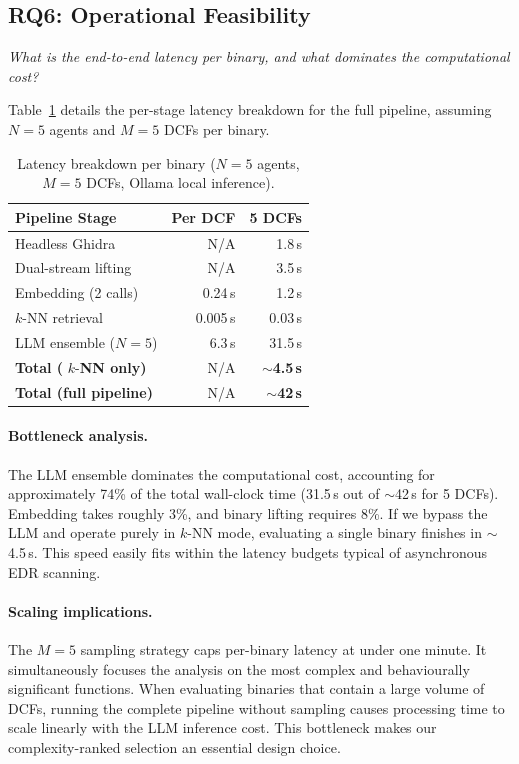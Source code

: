 \documentclass[pdflatex,sn-mathphys-num]{sn-jnl}
\begin{document}
\subsection{RQ6: Operational Feasibility}
\label{sec:rq6}
\textit{What is the end-to-end latency per binary, and what dominates
the computational cost?}

Table~\ref{tab:latency} details the per-stage latency breakdown for the
full pipeline, assuming $N{=}5$ agents and $M{=}5$ DCFs per binary.

\begin{table}[t]
\centering
\caption{Latency breakdown per binary ($N{=}5$ agents, $M{=}5$ DCFs, Ollama local inference).}
\label{tab:latency}
\small
\begin{tabular}{@{}lrr@{}}
\toprule
\textbf{Pipeline Stage} & \textbf{Per DCF} & \textbf{5 DCFs} \\
\midrule
Headless Ghidra  & N/A & 1.8\,s \\
Dual-stream lifting & N/A & 3.5\,s \\
Embedding (2 calls) & 0.24\,s & 1.2\,s \\
$k$-NN retrieval & 0.005\,s & 0.03\,s \\
LLM ensemble ($N{=}5$) & 6.3\,s & 31.5\,s \\
\midrule
    \textbf{Total (} $k$-\textbf{NN only)} & N/A & $\sim$\textbf{4.5\,s} \\
\textbf{Total (full pipeline)} & N/A & $\sim$\textbf{42\,s} \\
\bottomrule
\end{tabular}
\end{table}

\paragraph{Bottleneck analysis.}
The LLM ensemble dominates the computational cost, accounting for approximately 74\% of the total wall-clock time (31.5\,s out of $\sim$42\,s for 5 DCFs). Embedding takes roughly 3\%, and binary lifting requires 8\%. If we bypass the LLM and operate purely in $k$-NN mode, evaluating a single binary finishes in $\sim$4.5\,s. This speed easily fits within the latency budgets typical of asynchronous EDR scanning.

\paragraph{Scaling implications.}
The $M{=}5$ sampling strategy caps per-binary latency at under one minute. It simultaneously focuses the analysis on the most complex and behaviourally significant functions. When evaluating binaries that contain a large volume of DCFs, running the complete pipeline without sampling causes processing time to scale linearly with the LLM inference cost. This bottleneck makes our complexity-ranked selection an essential design choice.
\end{document}
